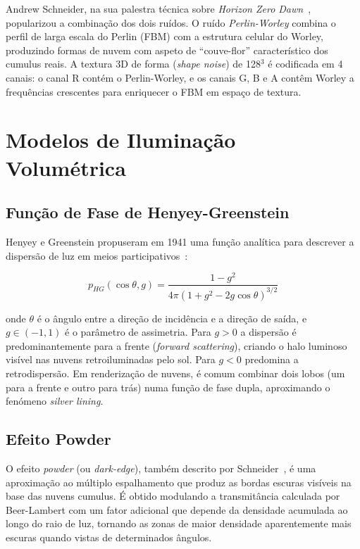 Andrew Schneider, na sua palestra técnica sobre \textit{Horizon Zero Dawn}~\cite{schneider2015}, popularizou a combinação dos dois ruídos. O ruído \emph{Perlin-Worley} combina o perfil de larga escala do Perlin (FBM) com a estrutura celular do Worley, produzindo formas de nuvem com aspeto de ``couve-flor'' característico dos cumulus reais. A textura 3D de forma (\emph{shape noise}) de 128$^3$ é codificada em 4 canais: o canal R contém o Perlin-Worley, e os canais G, B e A contêm Worley a frequências crescentes para enriquecer o FBM em espaço de textura.

\section{Modelos de Iluminação Volumétrica}
\label{chap2:sec:ilum}

\subsection{Função de Fase de Henyey-Greenstein}
\label{chap2:subsec:hg}

Henyey e Greenstein propuseram em 1941 uma função analítica para descrever a dispersão de luz em meios participativos~\cite{hg1941}:

\begin{equation}
p_{HG}(\cos\theta, g) = \frac{1-g^2}{4\pi \left(1 + g^2 - 2g\cos\theta\right)^{3/2}}
\label{eq:hg}
\end{equation}

\noindent onde $\theta$ é o ângulo entre a direção de incidência e a direção de saída, e $g \in (-1, 1)$ é o parâmetro de assimetria. Para $g > 0$ a dispersão é predominantemente para a frente (\emph{forward scattering}), criando o halo luminoso visível nas nuvens retroiluminadas pelo sol. Para $g < 0$ predomina a retrodispersão. Em renderização de nuvens, é comum combinar dois lobos (um para a frente e outro para trás) numa função de fase dupla, aproximando o fenómeno \emph{silver lining}.

\subsection{Efeito Powder}
\label{chap2:subsec:powder}

O efeito \emph{powder} (ou \emph{dark-edge}), também descrito por Schneider~\cite{schneider2015}, é uma aproximação ao múltiplo espalhamento que produz as bordas escuras visíveis na base das nuvens cumulus. É obtido modulando a transmitância calculada por Beer-Lambert com um fator adicional que depende da densidade acumulada ao longo do raio de luz, tornando as zonas de maior densidade aparentemente mais escuras quando vistas de determinados ângulos.

